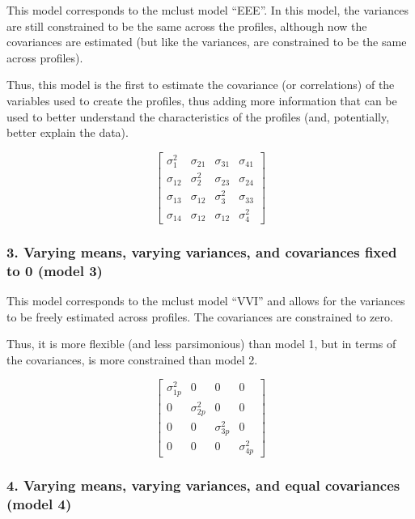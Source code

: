 \documentclass[]{book}
\theoremstyle{definition}
\theoremstyle{definition}
\theoremstyle{definition}
\theoremstyle{remark}
\begin{document}
This model corresponds to the mclust model ``EEE''. In this model, the
variances are still constrained to be the same across the profiles,
although now the covariances are estimated (but like the variances, are
constrained to be the same across profiles).

Thus, this model is the first to estimate the covariance (or
correlations) of the variables used to create the profiles, thus adding
more information that can be used to better understand the
characteristics of the profiles (and, potentially, better explain the
data).

\[
\left[ \begin{matrix} { \sigma  }_{ 1 }^{ 2 } & { \sigma  }_{ 21 } & { \sigma  }_{ 31 } & { \sigma  }_{ 41 } \\ { \sigma  }_{ 12 } & { \sigma  }_{ 2 }^{ 2 } & { \sigma  }_{ 23 } & { \sigma  }_{ 24 } \\ { \sigma  }_{ 13 } & { \sigma  }_{ 12 } & { \sigma  }_{ 3 }^{ 2 } & { \sigma  }_{ 33 } \\ { \sigma  }_{ 14 } & { \sigma  }_{ 12 } & { \sigma  }_{ 12 } & { \sigma  }_{ 4 }^{ 2 } \end{matrix} \right] 
\]

\subsubsection{3. Varying means, varying variances, and covariances
fixed to 0 (model
3)}\label{varying-means-varying-variances-and-covariances-fixed-to-0-model-3}

This model corresponds to the mclust model ``VVI'' and allows for the
variances to be freely estimated across profiles. The covariances are
constrained to zero.

Thus, it is more flexible (and less parsimonious) than model 1, but in
terms of the covariances, is more constrained than model 2.

\[ 
\left[ \begin{matrix} { \sigma  }_{ 1p }^{ 2 } & 0 & 0 & 0 \\ 0 & { \sigma  }_{ 2p }^{ 2 } & 0 & 0 \\ 0 & 0 & { \sigma  }_{ 3p }^{ 2 } & 0 \\ 0 & 0 & 0 & { \sigma  }_{ 4p }^{ 2 } \end{matrix} \right] 
\]

\subsubsection{4. Varying means, varying variances, and equal
covariances (model
4)}\label{varying-means-varying-variances-and-equal-covariances-model-4}
\end{document}
